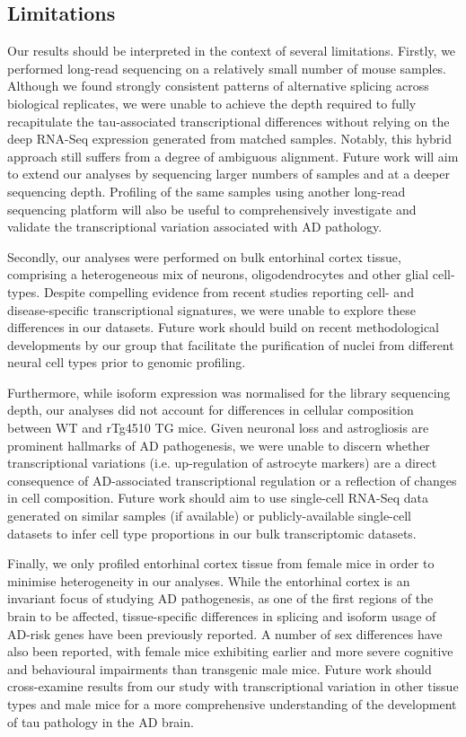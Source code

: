 \subsection{Limitations}
Our results should be interpreted in the context of several limitations. Firstly, we performed long-read sequencing on a relatively small number of mouse samples. Although we found strongly consistent patterns of alternative splicing across biological replicates, we were unable to achieve the depth required to fully recapitulate the tau-associated transcriptional differences without relying on the deep RNA-Seq expression generated from matched samples. Notably, this hybrid approach still suffers from a degree of ambiguous alignment. Future work will aim to extend our analyses by sequencing larger numbers of samples and at a deeper sequencing depth. Profiling of the same samples using another long-read sequencing platform will also be useful to comprehensively investigate and validate the transcriptional variation associated with AD pathology. 

Secondly, our analyses were performed on bulk entorhinal cortex tissue, comprising a heterogeneous mix of neurons, oligodendrocytes and other glial cell-types. Despite compelling evidence from recent studies reporting cell- and disease-specific transcriptional signatures, we were unable to explore these differences in our datasets. Future work should build on recent methodological developments by our group that facilitate the purification of nuclei from different neural cell types prior to genomic profiling\cite{Stefprotocol}.

Furthermore, while isoform expression was normalised for the library sequencing depth, our analyses did not account for differences in cellular composition between WT and rTg4510 TG mice. Given neuronal loss and astrogliosis are prominent hallmarks of AD pathogenesis, we were unable to discern whether transcriptional variations (i.e. up-regulation of astrocyte markers) are a direct consequence of AD-associated transcriptional regulation or a reflection of changes in cell composition. Future work should aim to use single-cell RNA-Seq data generated on similar samples (if available) or publicly-available single-cell datasets\cite{Joglekar2021} to infer cell type proportions in our bulk transcriptomic datasets. 

Finally, we only profiled entorhinal cortex tissue from female mice in order to minimise heterogeneity in our analyses. While the entorhinal cortex is an invariant focus of studying AD pathogenesis, as one of the first regions of the brain to be affected, tissue-specific differences in splicing and isoform usage of AD-risk genes have been previously reported\cite{Monti2021}. A number of sex differences have also been reported, with female mice exhibiting earlier and more severe cognitive and behavioural impairments than transgenic male mice\cite{M2011}. Future work should cross-examine results from our study with transcriptional variation in other tissue types and male mice for a more comprehensive understanding of the development of tau pathology in the AD brain. 

